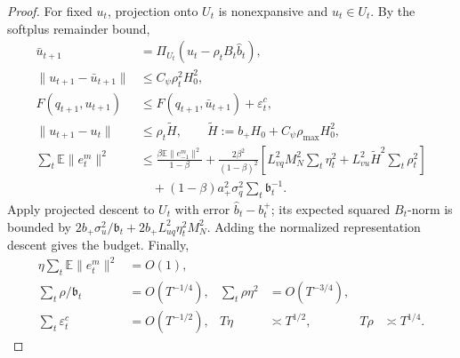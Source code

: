 \begin{proof}
For fixed $u_t$, projection onto $U_t$ is nonexpansive and $u_t\in U_t$.
By the softplus remainder bound,
\begin{align}
 \bar u_{t+1}&=\Pi_{U_t}(u_t-\rho_tB_t\widehat b_t),\\
 \|u_{t+1}-\bar u_{t+1}\|&\le C_\psi\rho_t^2H_0^2,\\
 F(q_{t+1},u_{t+1})&\le F(q_{t+1},\bar u_{t+1})+\varepsilon_t^c,\\
 \|u_{t+1}-u_t\|&\le\rho_t\widetilde H,
 \qquad\widetilde H:=b_+H_0+C_\psi\rho_{\max}H_0^2,\\
 \sum_t\mathbb E\|e_t^m\|^2
 &\le\frac{\beta\mathbb E\|e_{-1}^m\|^2}{1-\beta}+
 \frac{2\beta^2}{(1-\beta)^2}
 \left[L_{vq}^2M_N^2\sum_t\eta_t^2+
 L_{vu}^2\widetilde H^2\sum_t\rho_t^2\right]\\
 &\quad+(1-\beta)a_+^2\sigma_q^2\sum_t\mathfrak b_t^{-1}.
\end{align}
Apply projected descent to $U_t$ with error $\widehat b_t-b_t^+$; its expected squared $B_t$-norm is bounded by
$2b_+\sigma_u^2/\mathfrak b_t+2b_+L_{uq}^2\eta_t^2M_N^2$.
Adding the normalized representation descent gives the budget. Finally,
\begin{align}
 \eta\sum_t\mathbb E\|e_t^m\|^2&=O(1),\\
 \sum_t\rho/\mathfrak b_t&=O(T^{-1/4}),&
 \sum_t\rho\eta^2&=O(T^{-3/4}),\\
 \sum_t\varepsilon_t^c&=O(T^{-1/2}),&
 T\eta&\asymp T^{1/2},&T\rho&\asymp T^{1/4}.
\end{align}
\end{proof}

